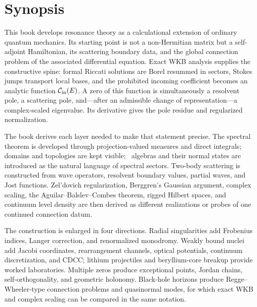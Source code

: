 \chapter*{Synopsis}

This book develops resonance theory as a calculational extension of ordinary
quantum mechanics.  Its starting point is not a non-Hermitian matrix but a
self-adjoint Hamiltonian, its scattering boundary data, and the global
connection problem of the associated differential equation.  Exact WKB
analysis supplies the constructive spine: formal Riccati solutions are Borel
resummed in sectors, Stokes jumps transport local bases, and the prohibited
incoming coefficient becomes an analytic function
$\mathcal{C}_{\mathrm{in}}(E)$.  A zero of this function is simultaneously a
resolvent pole, a scattering pole, and---after an admissible change of
representation---a complex-scaled eigenvalue.  Its derivative gives the pole
residue and regularized normalization.

The book derives each layer needed to make that statement precise.  The
spectral theorem is developed through projection-valued measures and direct
integrals; domains and topologies are kept visible; \vN\ algebras and
their normal states are introduced as the natural language of spectral
sectors.  Two-body scattering is constructed from wave operators, resolvent
boundary values, partial waves, and Jost functions.  Zel'dovich
regularization, Berggren's Gaussian argument, complex scaling, the
Aguilar--Balslev--Combes theorem, rigged Hilbert spaces, and continuum level
density are then derived as different realizations or probes of one continued
connection datum.

The construction is enlarged in four directions.  Radial singularities add
Frobenius indices, Langer correction, and renormalized monodromy.  Weakly
bound nuclei add Jacobi coordinates, rearrangement channels, optical
potentials, continuum discretization, and CDCC; lithium projectiles and
beryllium-core breakup provide worked laboratories.  Multiple zeros produce
exceptional points, Jordan chains, self-orthogonality, and geometric
holonomy.  Black-hole horizons produce Regge--Wheeler-type connection
problems and quasinormal modes, for which exact WKB and complex scaling can be
compared in the same notation.

